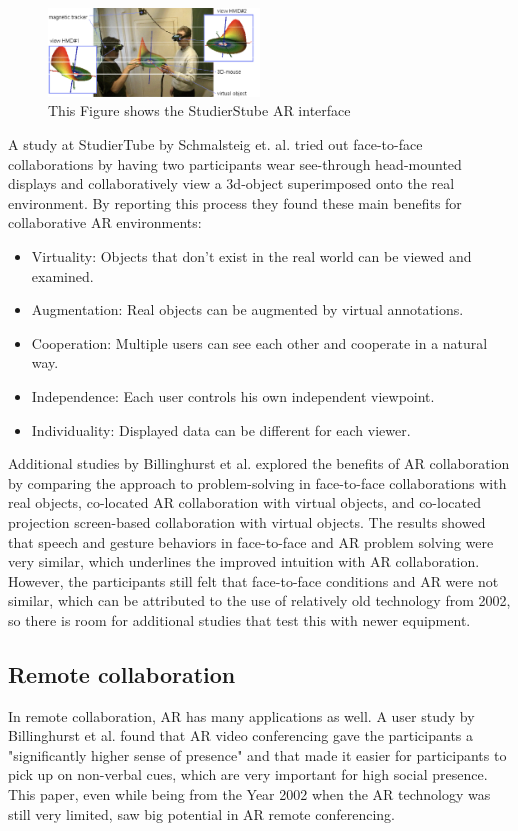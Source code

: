 \begin{figure}[H]
\centering
\includegraphics[width = 0.5\textwidth]{figures/Bildschirmfoto 2022-06-10 um 18.47.26}
\caption[Study 1 setup]{This Figure shows the StudierStube AR interface}
\label{fig::StudierStube}
\end{figure}

 A study at StudierTube by Schmalsteig et. al. \cite{studierstube} tried out face-to-face collaborations by having two participants wear see-through head-mounted displays and collaboratively view a 3d-object superimposed onto the real environment. By reporting this process they found these main benefits for collaborative AR environments:

\begin{itemize}
\item Virtuality: Objects that don’t exist in the real world can be viewed and examined. 
\item  Augmentation: Real objects can be augmented by virtual annotations. 
\item  Cooperation: Multiple users can see each other and cooperate in a natural way. 
\item Independence: Each user controls his own independent viewpoint.
\item Individuality: Displayed data can be different for each viewer.
\end{itemize}

Additional studies by Billinghurst et al. explored the benefits of AR collaboration by comparing the approach to problem-solving in face-to-face collaborations with real objects, co-located AR collaboration with virtual objects, and co-located projection screen-based collaboration with virtual objects. The results showed that speech and gesture behaviors in face-to-face and AR problem solving were very similar, which underlines the improved intuition with AR collaboration. However, the participants still felt that face-to-face conditions and AR were not similar, which can be attributed to the use of relatively old technology from 2002, so there is room for additional studies that test this with newer equipment.

\subsection{Remote collaboration}

In remote collaboration, AR has many applications as well. A user study by Billinghurst et al. found that AR video conferencing gave the participants a "significantly higher sense of presence" and that made it easier for participants to pick up on non-verbal cues, which are very important for high social presence. This paper, even while being from the Year 2002 when the AR technology was still very limited, saw big potential in AR remote conferencing.
